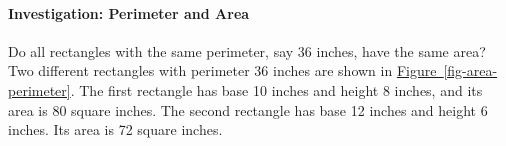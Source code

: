 \documentclass[10pt,]{book}
\theoremstyle{plain}
\theoremstyle{definition}
\theoremstyle{definition}
\numberwithin{equation}{section}
\newcounter{figstack}
\newlength\fight
\newcommand\pushValignCaptionBottom[5][b]{%
\stepcounter{figstack}%
\expandafter\def\csname %
figalign\romannumeral\value{figstack}\endcsname{#1}%
\expandafter\def\csname %
figtype\romannumeral\value{figstack}\endcsname{#2}%
\expandafter\def\csname %
figwd\romannumeral\value{figstack}\endcsname{#3}%
\expandafter\def\csname %
figcontent\romannumeral\value{figstack}\endcsname{#4}%
\expandafter\def\csname %
figcap\romannumeral\value{figstack}\endcsname{#5}%
\setbox0=\hbox{%
\begin{#2}{#3}#4\end{#2}}%
\ifdim\dimexpr\ht0+\dp0\relax>\fight\global\setlength{\fight}{%
\dimexpr\ht0+\dp0\relax}\fi%
}
\begin{document}
\paragraph[Investigation: Perimeter and Area]{Investigation: Perimeter and Area}\label{paragraphs-19}

            Do all rectangles with the same perimeter, say 36 inches, have the same area? Two different rectangles with perimeter 36 inches are shown in \hyperref[fig-area-perimeter]{Figure~\ref{fig-area-perimeter}}. The first rectangle has base 10 inches and height 8 inches, and its area is 80 square inches. The second rectangle has base 12 inches and height 6 inches. Its area is 72 square inches.
\leavevmode%
\end{document}
